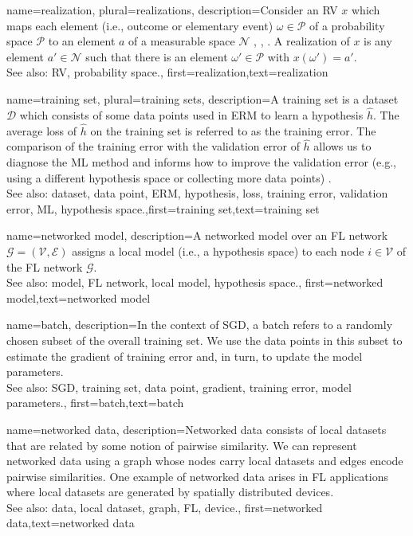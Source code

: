 	
{name={realization}, plural={realizations},
	description={Consider an RV $x$ which maps each element 
	(i.e., outcome or elementary event) $\omega \in \mathcal{P}$ of a probability space $\mathcal{P}$ 
	to an element $a$ of a measurable space $\mathcal{N}$ \cite{RudinBookPrinciplesMatheAnalysis}, \cite{HalmosMeasure}, \cite{BillingsleyProbMeasure}. 
	A realization of $x$ is any element $a' \in \mathcal{N}$ such that there is 
	an element $\omega' \in \mathcal{P}$ with $x(\omega') = a'$.
			\\
		See also: RV, probability space.}, first={realization},text={realization}  }

{name={training set}, plural={training sets},
description={A training set is a dataset $\mathcal{D}$ which consists of some data points used in ERM 
	to learn a hypothesis $\hat{h}$. The average loss of $\hat{h}$ on the 
	training set is referred to as the training error. The comparison of the training error with the 
	validation error of $\hat{h}$ allows us to diagnose the ML method and informs how to improve 
	the validation error (e.g., using a different hypothesis space or collecting more data points) \cite[Sec. 6.6]{MLBasics}.
			\\
		See also: dataset, data point, ERM, hypothesis, loss, training error, validation error, ML, hypothesis space.},first={training set},text={training set}  
}

{name={networked model},
  description={A networked model over an FL network $\mathcal{G} = \left( \mathcal{V},\mathcal{E} \right)$ assigns 
   a local model (i.e., a hypothesis space) to each node $i \in \mathcal{V}$ of the FL network $\mathcal{G}$.
   		\\
		See also: model, FL network, local model, hypothesis space.}, 
   first={networked model},text={networked model}  
}

{
	name={batch},
	description={In the context of SGD, a batch refers to a randomly 
	chosen subset of the overall training set. We use the data points in this subset 
	to estimate the gradient of training error and, in turn, to update the model parameters.
			\\
		See also: SGD, training set, data point, gradient, training error, model parameters.}, 
	first={batch},text={batch}  
}

{
	name={networked data},
	description={Networked data consists of local datasets 
	that are related by some notion of pairwise similarity. We can represent networked 
	data using a graph whose nodes carry local datasets and edges encode 
	pairwise similarities. One example of networked data arises in FL applications 
	where local datasets are generated by spatially distributed devices.
			\\
		See also: data, local dataset, graph, FL, device.}, 
	first={networked data},text={networked data}  
}

